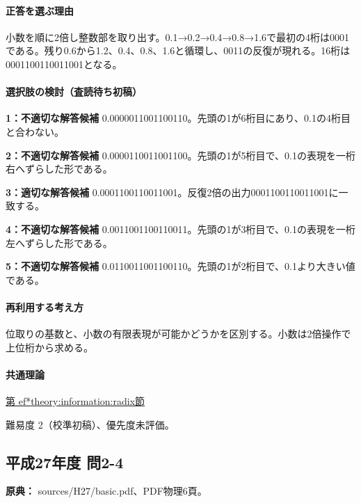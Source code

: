 \paragraph{正答を選ぶ理由} 小数を順に2倍し整数部を取り出す。0.1→0.2→0.4→0.8→1.6で最初の4桁は0001である。残り0.6から1.2、0.4、0.8、1.6と循環し、0011の反復が現れる。16桁は0001100110011001となる。

\paragraph{選択肢の検討（査読待ち初稿）}

\noindent\textbf{1：不適切な解答候補} 0.0000011001100110。先頭の1が6桁目にあり、0.1の4桁目と合わない。\par

\noindent\textbf{2：不適切な解答候補} 0.0000110011001100。先頭の1が5桁目で、0.1の表現を一桁右へずらした形である。\par

\noindent\textbf{3：適切な解答候補} 0.0001100110011001。反復2倍の出力0001100110011001に一致する。\par

\noindent\textbf{4：不適切な解答候補} 0.0011001100110011。先頭の1が3桁目で、0.1の表現を一桁左へずらした形である。\par

\noindent\textbf{5：不適切な解答候補} 0.0110011001100110。先頭の1が2桁目で、0.1より大きい値である。\par

\paragraph{再利用する考え方} 位取りの基数と、小数の有限表現が可能かどうかを区別する。小数は2倍操作で上位桁から求める。

\paragraph{共通理論} \hyperref[theory:information:radix]{第
ef*{theory:information:radix}節}

\par 難易度 2（校準初稿）、優先度未評価。

\subsection{平成27年度 問2-4}
\label{q:h27-reg-basic-2-4}

\noindent\textbf{原典：} sources/H27/basic.pdf、PDF物理6頁。


